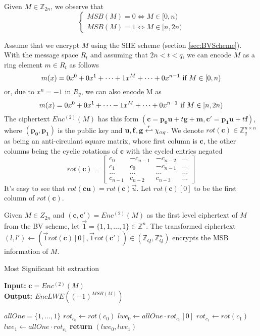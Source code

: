 Given $M \in \mathbb{Z}_{2n}$, we observe that
\[
  \begin{cases}
    MSB(M) = 0 \iff M \in [0, n)\\
    MSB(M) = 1 \iff M \in [n, 2n)
  \end{cases}
\]

Assume that we encrypt $M$ using the SHE scheme (section
\ref{sec:BVScheme}). With the message space $R_t$ and assuming that $2n < t < q$,
we can encode $M$ as a ring element $m \in R_t$ as follows
\[
  m(x) = 0x^0 + 0x^1 + \dots + 1x^M + \dots + 0x^{n-1}
  \ \textnormal{if} \ M \in [0,n)
\]
or, due to $x^n = -1$ in $R_q$, we can also encode M as
\[
  m(x) = 0x^0 + 0x^1 + \dots - 1x^M + \dots + 0x^{n-1}
  \ \textnormal{if} \ M \in [n,2n)
\]
The ciphertext $Enc^{(2)}(M)$ has this form
$(\mathbf{c} = \mathbf{p_0}\mathbf{u} + t\mathbf{g} + \mathbf{m}, \mathbf{c'} =
\mathbf{p_1}\mathbf{u} + t\mathbf{f})$, where $(\mathbf{p_0}, \mathbf{p_1})$ is
the public key and
$\mathbf{u}, \mathbf{f}, \mathbf{g} \stackrel{r}{\hookleftarrow} \chi_{\alpha q}$.  We denote
$ rot({\textbf{c}}) \in \mathbb{Z}_q^{n\times n}$ as being an anti-circulant
square matrix, whose first column is $\mathbf{c}$, the other columns being the
cyclic rotations of $\mathbf{c}$ with the cycled entries negated
\[
  rot({\mathbf{c}})=
  \begin{bmatrix}
    c_0 & -c_{n-1} & -c_{n-2} & \dots\\
    c_1 & c_0 & -c_{n-1} & \dots\\
    \dots & \dots & \dots & \dots\\
    c_{n-1} & c_{n-2} & c_{n-3} & \dots
  \end{bmatrix}
\]
It's easy to see that $rot(\mathbf{c}\mathbf{u}) = rot(\mathbf{c})
\vec{u}$. Let $rot(\mathbf{c})[0]$ to be the first column of $rot(\mathbf{c})$.

\begin{lemma}\label{lemma:bitToBin}
	Given $M \in Z_{2n}$ and $(\mathbf{c},\mathbf{c'}) = Enc^{(2)}(M)$ as the first level ciphertext of $M$ from the BV scheme, let $\vec{1} = \{1,1,\dots,1\} \in \mathbb{Z}^n$. The transformed ciphertext $(l, l') \leftarrow (\vec{1}
	rot({\mathbf{c}})[0], \vec{1}
	rot({\mathbf{c'}})) \in (\mathbb{Z}_Q
	, \mathbb{Z}_Q^n)$ encrypts the MSB information of $M$.
\end{lemma}

\begin{algorithm}
  \caption{Most Significant bit extraction}\label{alg:MSBExtract}
  \hspace*{\algorithmicindent} \textbf{Input:} $\mathbf{c} = Enc^{(2)}(M)$ \\
  \hspace*{\algorithmicindent} \textbf{Output: $EncLWE((-1)^{MSB(M)})$} 
  \begin{algorithmic}[1]
    \State $allOne = \{1,\dots,1\}$
    \State $rot_{c_0} \gets rot(c_0)$
    \State $lwe_0 \gets allOne \cdot rot_{c_0}[0]$
    \State $rot_{c_1} \gets rot(c_1)$
    \State $lwe_1 \gets allOne \cdot rot_{c_1}$
    \State \textbf{return} $(lwe_0,lwe_1)$
    \EndProcedure
  \end{algorithmic}
\end{algorithm}


